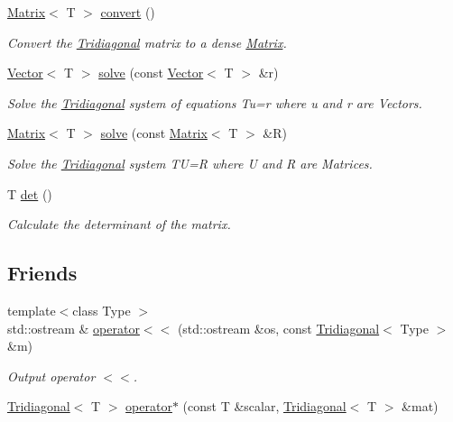 \begin{DoxyCompactItemize}
\hyperlink{classLuna_1_1Matrix}{Matrix}$<$ T $>$ \hyperlink{classLuna_1_1Tridiagonal_a08725d56da8a556ebbd7dd810006cea3}{convert} ()
\begin{DoxyCompactList}\small\item\em Convert the \hyperlink{classLuna_1_1Tridiagonal}{Tridiagonal} matrix to a dense \hyperlink{classLuna_1_1Matrix}{Matrix}. \end{DoxyCompactList}\item 
\hyperlink{classLuna_1_1Vector}{Vector}$<$ T $>$ \hyperlink{classLuna_1_1Tridiagonal_a760fdf1ceb44e2ff380770eefb13d023}{solve} (const \hyperlink{classLuna_1_1Vector}{Vector}$<$ T $>$ \&r)
\begin{DoxyCompactList}\small\item\em Solve the \hyperlink{classLuna_1_1Tridiagonal}{Tridiagonal} system of equations Tu=r where u and r are Vectors. \end{DoxyCompactList}\item 
\hyperlink{classLuna_1_1Matrix}{Matrix}$<$ T $>$ \hyperlink{classLuna_1_1Tridiagonal_a17ca16d2ddd5dc94cf5bb928d0f32dbb}{solve} (const \hyperlink{classLuna_1_1Matrix}{Matrix}$<$ T $>$ \&R)
\begin{DoxyCompactList}\small\item\em Solve the \hyperlink{classLuna_1_1Tridiagonal}{Tridiagonal} system TU=R where U and R are Matrices. \end{DoxyCompactList}\item 
T \hyperlink{classLuna_1_1Tridiagonal_ab1be45e74b066c5e2ac73d4d1cccb3da}{det} ()
\begin{DoxyCompactList}\small\item\em Calculate the determinant of the matrix. \end{DoxyCompactList}\end{DoxyCompactItemize}
\subsection*{Friends}
\begin{DoxyCompactItemize}
\item 
{\footnotesize template$<$class Type $>$ }\\std\+::ostream \& \hyperlink{classLuna_1_1Tridiagonal_aa1c4dcdd1f5d0158cbe438b3e21ff84c}{operator$<$$<$} (std\+::ostream \&os, const \hyperlink{classLuna_1_1Tridiagonal}{Tridiagonal}$<$ Type $>$ \&m)
\begin{DoxyCompactList}\small\item\em Output operator $<$$<$. \end{DoxyCompactList}\item 
\hyperlink{classLuna_1_1Tridiagonal}{Tridiagonal}$<$ T $>$ \hyperlink{classLuna_1_1Tridiagonal_abe10d406eb98ff667ab39c57ce8768be}{operator$\ast$} (const T \&scalar, \hyperlink{classLuna_1_1Tridiagonal}{Tridiagonal}$<$ T $>$ \&mat)
\end{DoxyCompactItemize}


